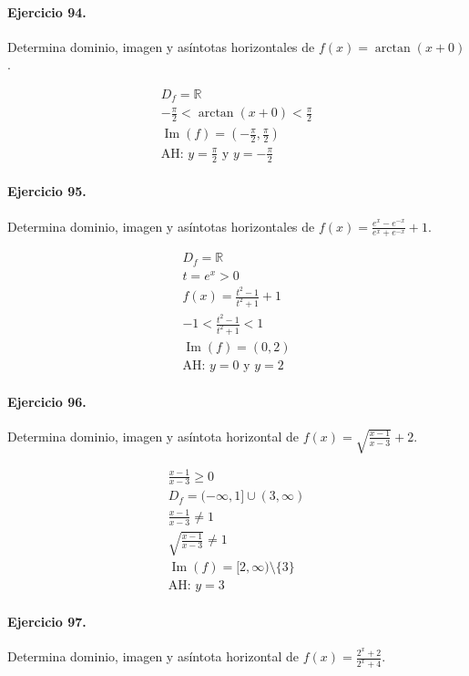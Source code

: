 \documentclass[11pt,a4paper]{article}
\begin{document}
\paragraph{Ejercicio 94.} Determina dominio, imagen y asíntotas horizontales de $f(x)=\arctan(x+0)$.

\[
\begin{aligned}
D_f=\mathbb{R}\\
-\frac{\pi}{2}<\arctan(x+0)<\frac{\pi}{2}\\
\operatorname{Im}(f)=\left(-\frac{\pi}{2},\frac{\pi}{2}\right)\\
\text{AH: }y=\frac{\pi}{2}\text{ y }y=-\frac{\pi}{2}
\end{aligned}
\]


\paragraph{Ejercicio 95.} Determina dominio, imagen y asíntotas horizontales de $f(x)=\frac{e^x-e^{-x}}{e^x+e^{-x}}+1$.

\[
\begin{aligned}
D_f=\mathbb{R}\\
t=e^x>0\\
f(x)=\frac{t^2-1}{t^2+1}+1\\
-1<\frac{t^2-1}{t^2+1}<1\\
\operatorname{Im}(f)=(0,2)\\
\text{AH: }y=0\text{ y }y=2
\end{aligned}
\]


\paragraph{Ejercicio 96.} Determina dominio, imagen y asíntota horizontal de $f(x)=\sqrt{\frac{x-1}{x-3}}+2$.

\[
\begin{aligned}
\frac{x-1}{x-3}\ge0\\
D_f=(-\infty,1]\cup(3,\infty)\\
\frac{x-1}{x-3}\ne1\\
\sqrt{\frac{x-1}{x-3}}\ne1\\
\operatorname{Im}(f)=[2,\infty)\setminus\{3\}\\
\text{AH: }y=3
\end{aligned}
\]


\paragraph{Ejercicio 97.} Determina dominio, imagen y asíntota horizontal de $f(x)=\frac{2^x+2}{2^x+4}$. 
\end{document}
